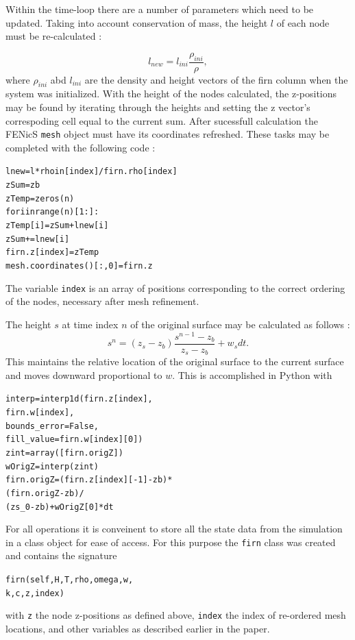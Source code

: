 \documentclass{article}%
\begin{document}
Within the time-loop there are a number of parameters which need to be updated.  Taking into account conservation of mass, the height $l$ of each node must be re-calculated :\par
  $$l_{new} = l_{ini} \frac{\rho_{ini}}{\rho},$$
where $\rho_{ini}$ abd $l_{ini}$ are the density and height vectors of the firn column when the system was initialized.  With the height of the nodes calculated, the z-positions may be found by iterating through the heights and setting the z vector's correspoding cell equal to the current sum.  After sucessfull calculation the FENicS \texttt{mesh} object must have its coordinates refreshed.  These tasks may be completed with the following code :\par
\footnotesize
\begin{alltt}
lnew     = l*rhoin[index] / firn.rho[index]
zSum     = zb
zTemp    = zeros(n)
for i in range(n)[1:]:
  zTemp[i] = zSum + lnew[i]
  zSum    += lnew[i]
firn.z[index] = zTemp
mesh.coordinates()[:,0] = firn.z
\end{alltt}
\normalsize
The variable \texttt{index} is an array of positions corresponding to the correct ordering of the nodes, necessary after mesh refinement.  

The height $s$ at time index $n$ of the original surface may be calculated as follows :
  $$s^{n} = (z_s - z_b) \frac{s^{n-1} - z_b}{z_{s} - z_b} + w_s dt.$$
This maintains the relative location of the original surface to the current surface and moves downward proportional to $w$.  This is accomplished in Python with\par
\footnotesize
\begin{alltt}
interp     = interp1d(firn.z[index], 
                      firn.w[index],
                      bounds_error=False,
                      fill_value=firn.w[index][0])
zint       = array([firn.origZ])
wOrigZ     = interp(zint)
firn.origZ = (firn.z[index][-1] - zb) * 
             (firn.origZ - zb) / 
             (zs_0 - zb) + wOrigZ[0] * dt
\end{alltt}
\normalsize

For all operations it is conveinent to store all the state data from the simulation in a class object for ease of access.  For this purpose the \texttt{firn} class was created and contains the signature\par 
\footnotesize
\begin{alltt}
firn(self, H, T, rho, omega, w, 
     k, c, z, index)
\end{alltt}
\normalsize
with \texttt{z} the node z-positions as defined above, \texttt{index} the index of re-ordered mesh locations, and other variables as described earlier in the paper.
\end{document}
